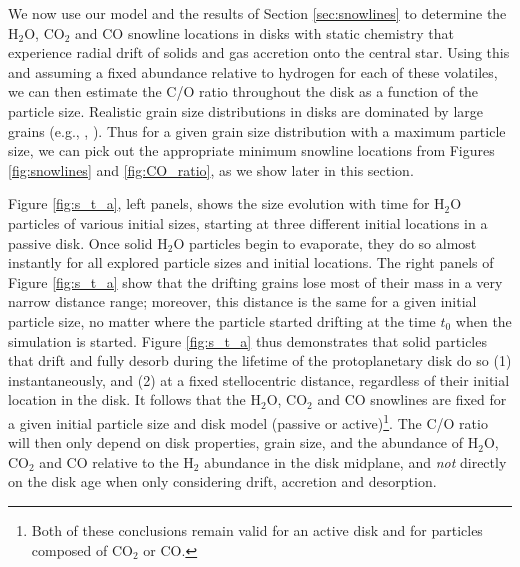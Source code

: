\documentclass[apj]{emulateapj}
\begin{document}
We now use our model and the results of Section \ref{sec:snowlines} to determine the H$_2$O, CO$_2$ and CO snowline locations in disks with static chemistry that experience radial drift of solids and gas accretion onto the central star. Using this and assuming a fixed abundance relative to hydrogen for each of these volatiles, we can then estimate the C/O ratio throughout the disk as a function of the particle size. Realistic grain size distributions in disks are dominated by large grains (e.g., \citealt{dalessio01}, \citealt{birnstiel12}). Thus for a given grain size distribution with a maximum particle size, we can pick out the appropriate minimum snowline locations from Figures \ref{fig:snowlines} and \ref{fig:CO_ratio}, as we show later in this section. 


Figure \ref{fig:s_t_a}, left panels, shows the size evolution with time for H$_2$O particles of various initial sizes, starting at three different initial locations in a passive disk. Once solid H$_2$O particles begin to evaporate, they do so almost instantly for all explored particle sizes and initial locations. %
The right panels of Figure \ref{fig:s_t_a} show that the drifting grains lose most of their mass in a very narrow distance range; moreover, this distance is the same for a given initial particle size, no matter where the particle started drifting at the time $t_0$ when the simulation is started. Figure \ref{fig:s_t_a} thus demonstrates that solid particles that drift and fully desorb during the lifetime of the protoplanetary disk do so (1) instantaneously, and (2) at a fixed stellocentric distance, regardless of their initial location in the disk. 
It follows that the H$_2$O, CO$_2$ and CO snowlines are fixed for a given initial particle size and disk model (passive or active)\footnote{Both of these conclusions remain valid for an active disk and for particles composed of CO$_2$ or CO.}. The C/O ratio will then only depend on disk properties, grain size, and the abundance of H$_2$O, CO$_2$ and CO relative to the H$_2$ abundance in the disk midplane, and {\it not} directly on the disk age when only considering drift, accretion and desorption. 
\end{document}
